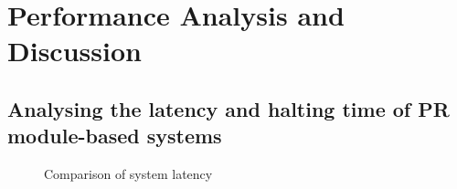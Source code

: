 \section{Performance Analysis and Discussion}
\label{sec:PerAna}
\subsection{Analysing the latency and halting time of PR module-based systems}

\begin{figure}
\caption{Comparison of system latency}
\label{fig:timing}
\end{figure}
 
